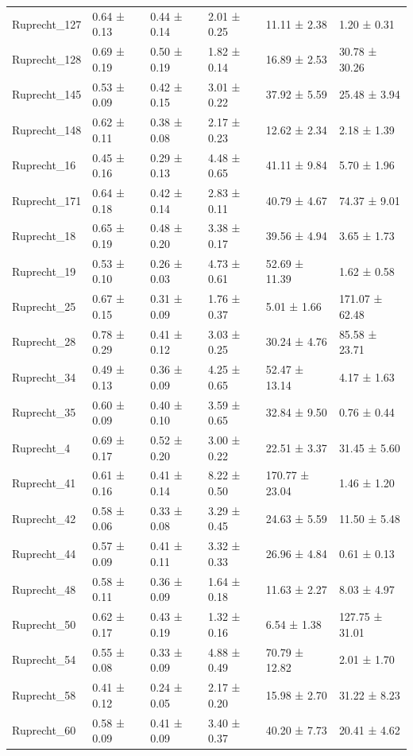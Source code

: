 \begin{tabular}{llllll}
Ruprecht_127 & 0.64 ± 0.13 & 0.44 ± 0.14 & 2.01 ± 0.25 & 11.11 ± 2.38 & 1.20 ± 0.31 \\
Ruprecht_128 & 0.69 ± 0.19 & 0.50 ± 0.19 & 1.82 ± 0.14 & 16.89 ± 2.53 & 30.78 ± 30.26 \\
Ruprecht_145 & 0.53 ± 0.09 & 0.42 ± 0.15 & 3.01 ± 0.22 & 37.92 ± 5.59 & 25.48 ± 3.94 \\
Ruprecht_148 & 0.62 ± 0.11 & 0.38 ± 0.08 & 2.17 ± 0.23 & 12.62 ± 2.34 & 2.18 ± 1.39 \\
Ruprecht_16 & 0.45 ± 0.16 & 0.29 ± 0.13 & 4.48 ± 0.65 & 41.11 ± 9.84 & 5.70 ± 1.96 \\
Ruprecht_171 & 0.64 ± 0.18 & 0.42 ± 0.14 & 2.83 ± 0.11 & 40.79 ± 4.67 & 74.37 ± 9.01 \\
Ruprecht_18 & 0.65 ± 0.19 & 0.48 ± 0.20 & 3.38 ± 0.17 & 39.56 ± 4.94 & 3.65 ± 1.73 \\
Ruprecht_19 & 0.53 ± 0.10 & 0.26 ± 0.03 & 4.73 ± 0.61 & 52.69 ± 11.39 & 1.62 ± 0.58 \\
Ruprecht_25 & 0.67 ± 0.15 & 0.31 ± 0.09 & 1.76 ± 0.37 & 5.01 ± 1.66 & 171.07 ± 62.48 \\
Ruprecht_28 & 0.78 ± 0.29 & 0.41 ± 0.12 & 3.03 ± 0.25 & 30.24 ± 4.76 & 85.58 ± 23.71 \\
Ruprecht_34 & 0.49 ± 0.13 & 0.36 ± 0.09 & 4.25 ± 0.65 & 52.47 ± 13.14 & 4.17 ± 1.63 \\
Ruprecht_35 & 0.60 ± 0.09 & 0.40 ± 0.10 & 3.59 ± 0.65 & 32.84 ± 9.50 & 0.76 ± 0.44 \\
Ruprecht_4 & 0.69 ± 0.17 & 0.52 ± 0.20 & 3.00 ± 0.22 & 22.51 ± 3.37 & 31.45 ± 5.60 \\
Ruprecht_41 & 0.61 ± 0.16 & 0.41 ± 0.14 & 8.22 ± 0.50 & 170.77 ± 23.04 & 1.46 ± 1.20 \\
Ruprecht_42 & 0.58 ± 0.06 & 0.33 ± 0.08 & 3.29 ± 0.45 & 24.63 ± 5.59 & 11.50 ± 5.48 \\
Ruprecht_44 & 0.57 ± 0.09 & 0.41 ± 0.11 & 3.32 ± 0.33 & 26.96 ± 4.84 & 0.61 ± 0.13 \\
Ruprecht_48 & 0.58 ± 0.11 & 0.36 ± 0.09 & 1.64 ± 0.18 & 11.63 ± 2.27 & 8.03 ± 4.97 \\
Ruprecht_50 & 0.62 ± 0.17 & 0.43 ± 0.19 & 1.32 ± 0.16 & 6.54 ± 1.38 & 127.75 ± 31.01 \\
Ruprecht_54 & 0.55 ± 0.08 & 0.33 ± 0.09 & 4.88 ± 0.49 & 70.79 ± 12.82 & 2.01 ± 1.70 \\
Ruprecht_58 & 0.41 ± 0.12 & 0.24 ± 0.05 & 2.17 ± 0.20 & 15.98 ± 2.70 & 31.22 ± 8.23 \\
Ruprecht_60 & 0.58 ± 0.09 & 0.41 ± 0.09 & 3.40 ± 0.37 & 40.20 ± 7.73 & 20.41 ± 4.62 \\

\end{tabular}
